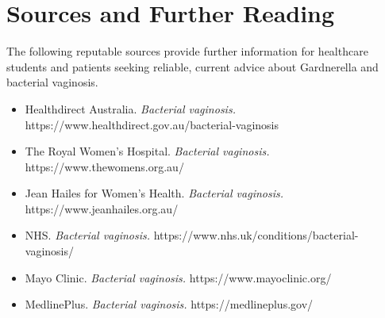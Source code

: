 \section*{Sources and Further Reading}
The following reputable sources provide further information for healthcare students and patients seeking reliable, current advice about Gardnerella and bacterial vaginosis.
\begin{itemize}
    \item Healthdirect Australia. \textit{Bacterial vaginosis.} https://www.healthdirect.gov.au/bacterial-vaginosis
    \item The Royal Women's Hospital. \textit{Bacterial vaginosis.} https://www.thewomens.org.au/
    \item Jean Hailes for Women's Health. \textit{Bacterial vaginosis.} https://www.jeanhailes.org.au/
    \item NHS. \textit{Bacterial vaginosis.} https://www.nhs.uk/conditions/bacterial-vaginosis/
    \item Mayo Clinic. \textit{Bacterial vaginosis.} https://www.mayoclinic.org/
    \item MedlinePlus. \textit{Bacterial vaginosis.} https://medlineplus.gov/
\end{itemize}
